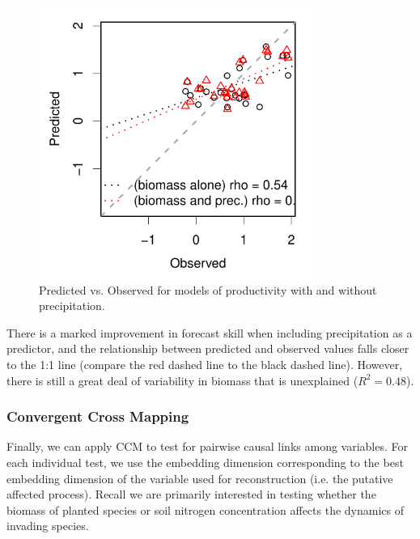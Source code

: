 \documentclass[article]{jss}
\begin{document}
\begin{figure}[t!]
\begin{center}
\includegraphics[width=3.5in]{article-obs-pred-e120}
\end{center}
\caption{\label{fig:obs-pred-e120} Predicted vs. Observed for models of productivity with and without precipitation.}
\end{figure}

There is a marked improvement in forecast skill when including precipitation as a predictor, and the relationship between predicted and observed values falls closer to the 1:1 line (compare the red dashed line to the black dashed line). However, there is still a great deal of variability in biomass that is unexplained ($R^2 = 0.48$).

\subsubsection{Convergent Cross Mapping}\label{sec:convergent-cross-mapping}

Finally, we can apply CCM to test for pairwise causal links among variables. For each individual test, we use the embedding dimension corresponding to the best embedding dimension of the variable used for reconstruction (i.e. the putative affected process). Recall we are primarily interested in testing whether the biomass of planted species or soil nitrogen concentration affects the dynamics of invading species.
\end{document}
